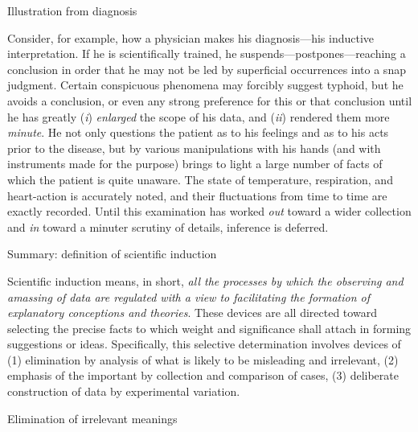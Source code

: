 \documentclass[letterpaper]{book}
\begin{document}
Illustration from diagnosis

Consider, for example, how a physician makes his diagnosis---his
inductive interpretation. If he is scientifically trained, he
suspends---postpones---reaching a conclusion in order that he may not be
led by superficial occurrences into a snap judgment. Certain conspicuous
phenomena may forcibly suggest typhoid, but he avoids a conclusion, or
even any strong preference for this or that conclusion until he has
greatly (\emph{i}) \emph{enlarged} the scope of his data, and
(\emph{ii}) rendered them more \emph{minute}. He not only questions the
patient as to his feelings and as to his acts prior to the disease, but
by various manipulations with his hands (and with instruments made for
the purpose) brings to light a large number of facts of which the
patient is quite unaware. The state of
temperature,
respiration, and heart-action is accurately noted, and their
fluctuations from time to time are exactly recorded. Until this
examination has worked \emph{out} toward a wider collection and
\emph{in} toward a minuter scrutiny of details, inference is deferred.

Summary: definition of scientific induction

Scientific induction means, in short, \emph{all the processes by which
the observing and amassing of data are regulated with a view to
facilitating the formation of explanatory conceptions and theories}.
These devices are all directed toward selecting the precise facts to
which weight and significance shall attach in forming suggestions or
ideas. Specifically, this selective determination involves devices of
(1) elimination by analysis of what is likely to be misleading and
irrelevant, (2) emphasis of the important by collection and comparison
of cases, (3) deliberate construction of data by experimental variation.

Elimination of irrelevant meanings
\end{document}
